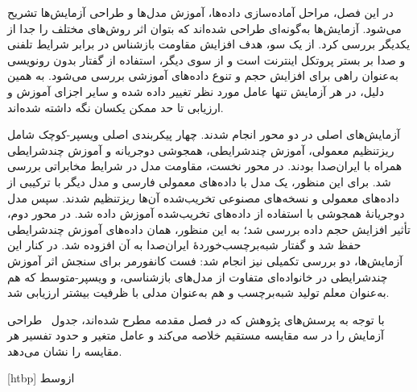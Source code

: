 
در این فصل، مراحل آماده‌سازی داده‌ها، آموزش مدل‌ها و طراحی آزمایش‌ها تشریح می‌شود. آزمایش‌ها به‌گونه‌ای طراحی شده‌اند که بتوان اثر روش‌های مختلف را جدا از یکدیگر بررسی کرد. از یک سو، هدف افزایش مقاومت بازشناس در برابر شرایط تلفنی و صدا بر بستر پروتکل اینترنت است و از سوی دیگر، استفاده از گفتار بدون رونویسی به‌عنوان راهی برای افزایش حجم و تنوع داده‌های آموزشی بررسی می‌شود. به همین دلیل، در هر آزمایش تنها عامل مورد نظر تغییر داده شده و سایر اجزای آموزش و ارزیابی تا حد ممکن یکسان نگه داشته شده‌اند.

آزمایش‌های اصلی در دو محور انجام شدند. چهار پیکربندی اصلی ویسپر-کوچک شامل ریزتنظیم معمولی، آموزش چندشرایطی، همجوشی دوجریانه و آموزش چندشرایطی همراه با ایران‌صدا بودند. در محور نخست، مقاومت مدل در شرایط مخابراتی بررسی شد. برای این منظور، یک مدل با داده‌های معمولی فارسی و مدل دیگر با ترکیبی از داده‌های معمولی و نسخه‌های مصنوعی تخریب‌شده آن‌ها ریزتنظیم شدند. سپس مدل دوجریانهٔ همجوشی با استفاده از داده‌های تخریب‌شده آموزش داده شد. در محور دوم، تأثیر افزایش حجم داده بررسی شد؛ به این منظور، همان داده‌های آموزش چندشرایطی حفظ شد و گفتار شبه‌برچسب‌خوردهٔ ایران‌صدا به آن افزوده شد. در کنار این آزمایش‌ها، دو بررسی تکمیلی نیز انجام شد: فست کانفورمر برای سنجش اثر آموزش چندشرایطی در خانواده‌ای متفاوت از مدل‌های بازشناسی، و ویسپر-متوسط که هم به‌عنوان معلم تولید شبه‌برچسب و هم به‌عنوان مدلی با ظرفیت بیشتر ارزیابی شد.


با توجه به پرسش‌های پژوهش که در فصل مقدمه مطرح شده‌اند، جدول~ طراحی آزمایش را در سه مقایسه مستقیم خلاصه می‌کند و عامل متغیر و حدود تفسیر هر مقایسه را نشان می‌دهد.


[htbp]
‌ازوسط

